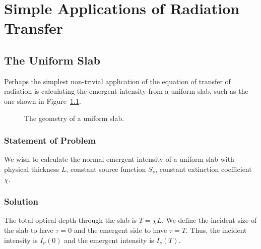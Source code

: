 
\chapter{Simple Applications of Radiation Transfer}

\section{The Uniform Slab}
\label{section-uniform-slab}

Perhaps the simplest non-trivial application of the equation of transfer of radiation is calculating the emergent intensity from a uniform slab, such as the one shown in Figure~\ref{fig-uniform-slab}.

\begin{figure}[b]
\begin{center}
\end{center}
\caption{The geometry of a uniform slab.}
\label{fig-uniform-slab}
\end{figure}

\newslide

\subsection{Statement of Problem}

We wish to calculate the normal emergent intensity of a uniform slab with physical thickness $L$, constant source function $S_\nu$, constant extinction coefficient $\chi$.

\subsection{Solution}

The total optical depth through the slab is $T=\chi L$. We define the incident size of the slab to have $\tau = 0$ and the emergent side to have $\tau = T$. Thus, the incident intensity is $I_\nu(0)$ and the emergent intensity is $I_\nu(T)$.

